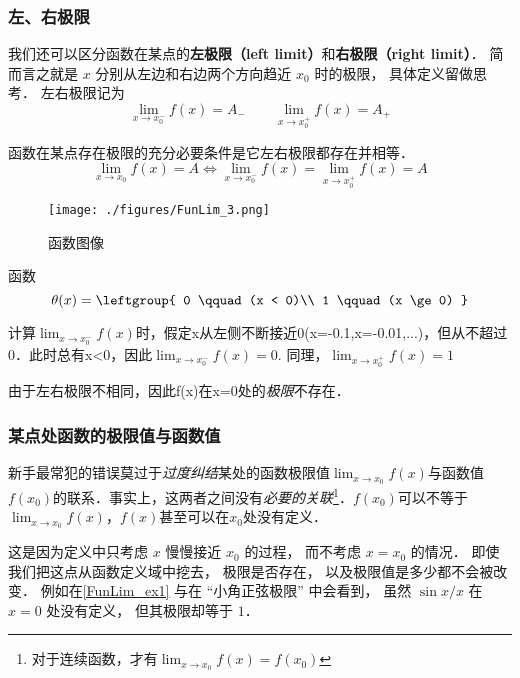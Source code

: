 \subsubsection{左、右极限}
我们还可以区分函数在某点的\textbf{左极限（left limit）}和\textbf{右极限（right limit）}． 简而言之就是 $x$ 分别从左边和右边两个方向趋近 $x_0$ 时的极限， 具体定义留做思考． 左右极限记为
\begin{equation}
\lim_{x\to x_0^-} f(x) = A_- \qquad \lim_{x\to x_0^+} f(x) = A_+
\end{equation}

\begin{theorem}{}
函数在某点存在极限的充分必要条件是它左右极限都存在并相等．
$$\lim_{x\to x_0} f(x) = A \Leftrightarrow \lim_{x\to x_0^-} f(x) = \lim_{x\to x_0^+} f(x) = A $$
\end{theorem}

\begin{example}{}
\begin{figure}[ht]
\centering
\texttt{[image: ./figures/FunLim\_3.png]}
\caption{函数图像} \label{FunLim_fig3}
\end{figure}
函数
\begin{equation}
\theta(x) = \leftgroup{
0 \qquad (x < 0)\\
1 \qquad (x \ge 0)
}\end{equation}

计算$\lim_{x\to x_0^-} f(x)$时，假定x从左侧不断接近0(x=-0.1,x=-0.01,...)，但从不超过0．此时总有x<0，因此$\lim_{x\to x_0^-} f(x) = 0$. 同理，$\lim_{x\to x_0^+} f(x) = 1$

由于左右极限不相同，因此f(x)在x=0处的\textsl{极限}不存在．
\end{example}

\subsubsection{某点处函数的极限值与函数值}
新手最常犯的错误莫过于\textsl{过度纠结}某处的函数极限值$\lim_{x\to x_0} f(x)$与函数值$f(x_0)$的联系．事实上，这两者之间没有\textsl{必要的关联}\footnote{对于连续函数，才有$\lim_{x\to x_0} f(x)=f(x_0)$}．$f(x_0)$可以不等于$\lim_{x\to x_0} f(x)$，$f(x)$甚至可以在$x_0$处没有定义．

这是因为定义中只考虑 $x$ 慢慢接近 $x_0$ 的过程， 而不考虑 $x = x_0$ 的情况． 即使我们把这点从函数定义域中挖去， 极限是否存在， 以及极限值是多少都不会被改变． 例如在\autoref{FunLim_ex1} 与在 “小角正弦极限” 中会看到， 虽然 $\sin x/ x$ 在 $x = 0$ 处没有定义， 但其极限却等于 $1$．


